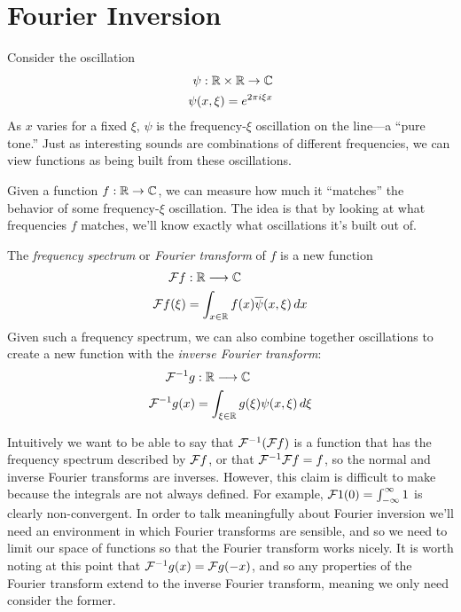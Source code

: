 
  \chapter{Fourier Inversion}

    Consider the oscillation
    \begin{align*}
      \psi:\mathbb{R}\times\mathbb{R}\rightarrow\mathbb{C}\\
      \psi(x,\xi) = e^{2\pi i \xi x}
    \end{align*}
    As $x$ varies for a fixed $\xi$, $\psi$ is the frequency-$\xi$ oscillation on the line---a ``pure tone.''
    Just as interesting sounds are combinations of different frequencies, we can view functions as being built from these oscillations. 

    Given a function $f:\mathbb{R}\rightarrow\mathbb{C}$, we can measure how much it ``matches'' the behavior of some frequency-$\xi$ oscillation.
    The idea is that by looking at what frequencies $f$ matches, we'll know exactly what oscillations it's built out of.
    \begin{defn}
      The \emph{frequency spectrum} or \emph{Fourier transform} of $f$ is a new function 
      \begin{align*}
        \mathcal{F} f&:\mathbb{R}\longrightarrow\mathbb{C}\\
        \mathcal{F} f(\xi) &= \int_{x\in\mathbb{R}} f(x)\overline\psi(x,\xi)\,dx
      \end{align*}
      Given such a frequency spectrum, we can also combine together oscillations to create a new function with the \emph{inverse Fourier transform}:
      \begin{align*}
        \mathcal{F}^{-1}g&:\mathbb{R}\longrightarrow\mathbb{C}\\
        \mathcal{F}^{-1}g(x) &= \int_{\xi\in\mathbb{R}} g(\xi)\psi(x,\xi)\,d\xi
      \end{align*}
      \vspace{-15pt}
    \end{defn}

    Intuitively we want to be able to say that $\mathcal{F}^{-1}(\mathcal{F} f)$ is a function that has the frequency spectrum described by $\mathcal{F} f$, or that $\mathcal{F}^{-1}\mathcal{F} f = f$, so the normal and inverse Fourier transforms are inverses. 
    However, this claim is difficult to make because the integrals are not always defined.
    For example, $\mathcal{F}1(0)=\int_{-\infty}^\infty1$ is clearly non-convergent.
    In order to talk meaningfully about Fourier inversion we'll need an environment in which Fourier transforms are sensible, and so we need to limit our space of functions so that the Fourier transform works nicely.
    It is worth noting at this point that $\mathcal{F}^{-1}g(x) = \mathcal{F} g(-x)$, and so any properties of the Fourier transform extend to the inverse Fourier transform, meaning we only need consider the former.

